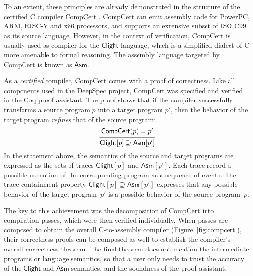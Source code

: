 \documentclass[11pt,oneside,draft]{book}
\theoremstyle{definition}
\newcommand{\kw}[1]{\ensuremath{ \mathsf{#1} }}
\begin{document}
To an extent,
these principles are already demonstrated in the structure of the
certified C compiler CompCert \citep{compcert}.
CompCert can emit assembly code
for PowerPC, ARM, RISC-V and x86 processors,
and supports an extensive subset of ISO C99
as its source language.
However,
in the context of verification,
CompCert is usually used as compiler for
the \kw{Clight} language,
which is a simplified dialect of C
more amenable to formal reasoning.
The assembly language
targeted by CompCert is known as \kw{Asm}.

As a \emph{certified} compiler,
CompCert comes with a proof of correctness.
Like all components used in the DeepSpec project,
CompCert was specified and verified
in the Coq proof assistant.
The proof shows that if the compiler successfully transforms
a source program $p$ into a target program $p'$,
then the behavior of the target program
\emph{refines} that of the source program:
\[
  \begin{prooftree}
    \hypo{\kw{CompCert}(p) = p'}
    \infer1{\kw{Clight}[p] \supseteq \kw{Asm}[p']}
  \end{prooftree}
\]
In the statement above,
the semantics of the source and target programs
are expressed as the sets of traces
$\kw{Clight}[p]$ and $\kw{Asm}[p']$.
Each trace record a possible execution of the corresponding program
as a sequence of events.
The trace containment property
$\kw{Clight}[p] \supseteq \kw{Asm}[p']$
expresses that any possible behavior of
the target program~$p'$
is a possible behavior of the source program~$p$.

The key to this achievement
was the decomposition of CompCert
into compilation passes,
which were then verified individually.
When passes are composed to obtain the overall
C-to-assembly compiler
(Figure~\ref{fig:compcert}),
their correctness proofs can be composed as well
to establish the compiler's overall correctness theorem.
The final theorem does not mention the intermediate
programs or language semantics,
so that a user only needs to trust
the accuracy of the \kw{Clight} and \kw{Asm} semantics,
and the soundness of the proof assistant.
\end{document}
